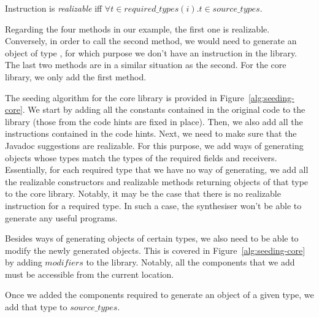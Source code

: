 \documentclass[sigconf,review,anonymous]{acmart}
\begin{document}

\begin{definition}\label{def:realizable}
Instruction  is {\em realizable} iff $\forall t \in required\_types(i). t \in source\_types$.
  
\end{definition}

Regarding the four methods in our example, the first one is realizable. Conversely, in order to call the second method, we would need to generate an object of type ,
for which purpose we don't have an instruction in the library.
The last two methods are in a similar situation as the second. For the core library, we only add the first method.


The seeding algorithm for the core library is provided in Figure~\ref{alg:seeding-core}.
We start by adding all the constants contained in the original code to the library
(those from the code hints are fixed in place).
Then, we also add all the instructions contained
in the code hints. Next, we need to make sure that the Javadoc suggestions
are realizable. For this purpose, we add ways of generating
objects whose types match the types of the required fields and receivers.
%
Essentially, for each required type that we have no way of generating, we add all the realizable
constructors and realizable methods returning objects of that type to the
core library.
Notably, it may be the case that there is no realizable instruction for a required type.
In such a case, the synthesiser won't be able to generate any useful programs.

Besides ways of generating objects of certain types, we also need to be able to
modify the newly generated objects. This is covered in Figure~\ref{alg:seeding-core}
by adding $modifiers$ to the library. Notably, all the components that
we add must be accessible from the current location.

Once we added the components required to generate an object of a given type,
we add that type to $source\_types$.
\end{document}
